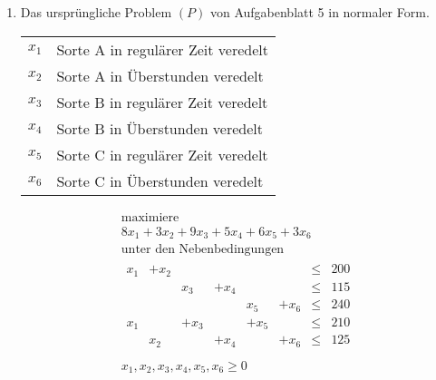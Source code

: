 \documentclass[a4paper]{scrartcl}
\begin{document}
\begin{enumerate}[label=\bfseries\arabic*.]
\begin{enumerate}
            \item
                Das ursprüngliche Problem $(P)$ von Aufgabenblatt 5 in normaler Form. \\
                \begin{tabular}{rl}
                    $x_1$ & Sorte A in regulärer Zeit veredelt \\
                    $x_2$ & Sorte A in Überstunden veredelt \\
                    $x_3$ & Sorte B in regulärer Zeit veredelt \\
                    $x_4$ & Sorte B in Überstunden veredelt \\
                    $x_5$ & Sorte C in regulärer Zeit veredelt \\
                    $x_6$ & Sorte C in Überstunden veredelt \\
                \end{tabular}
                \begin{equation}
                    \begin{gathered}
                        \text{maximiere} \\
                        8x_1 +3x_2 +9x_3 +5x_4 +6x_5 +3x_6 \\
                        \text{unter den Nebenbedingungen} \\
                        \begin{array}{rrrrrrcr}
                            x_1 & +x_2 & & & & &  \leq & 200 \\
                            & & x_3 & +x_4 & & &  \leq & 115 \\
                            & & & & x_5 & +x_6 &  \leq & 240 \\
                            x_1 & & +x_3 & & +x_5 & &  \leq & 210 \\
                            & x_2 & & +x_4 & & +x_6 &  \leq & 125 \\
                        \end{array} \\
                        x_1, x_2, x_3, x_4, x_5, x_6 \geq 0
                    \end{gathered}
                \end{equation}


\end{enumerate}
\end{enumerate}
\end{document}
